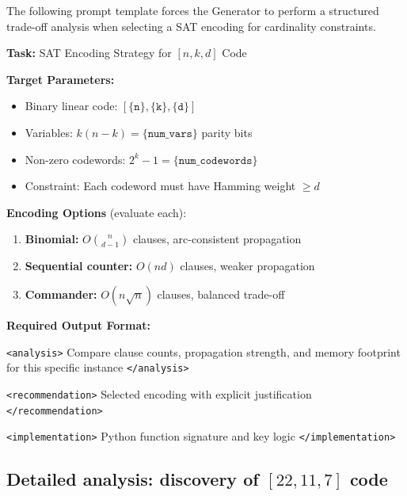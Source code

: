 The following prompt template forces the Generator to perform a structured trade-off analysis when selecting a SAT encoding for cardinality constraints.

\begin{tcolorbox}[enhanced, breakable, colback=white, colframe=black, title={Generator Prompt: SAT Encoding Strategy Selection}]
\textbf{Task:} SAT Encoding Strategy for $[n,k,d]$ Code

\tcbline

\textbf{Target Parameters:}
\begin{itemize}
\item Binary linear code: $[\texttt{\{n\}},\texttt{\{k\}},\texttt{\{d\}}]$
\item Variables: $k(n-k) = \texttt{\{num\_vars\}}$ parity bits
\item Non-zero codewords: $2^k - 1 = \texttt{\{num\_codewords\}}$
\item Constraint: Each codeword must have Hamming weight $\geq d$
\end{itemize}

\tcbline

\textbf{Encoding Options} (evaluate each):
\begin{enumerate}
\item \textbf{Binomial:} $O\binom{n}{d-1}$ clauses, arc-consistent propagation
\item \textbf{Sequential counter:} $O(nd)$ clauses, weaker propagation
\item \textbf{Commander:} $O(n\sqrt{n})$ clauses, balanced trade-off
\end{enumerate}

\tcbline

\textbf{Required Output Format:}

\texttt{<analysis>} Compare clause counts, propagation strength, and memory footprint for this specific instance \texttt{</analysis>}

\texttt{<recommendation>} Selected encoding with explicit justification \texttt{</recommendation>}

\texttt{<implementation>} Python function signature and key logic \texttt{</implementation>}
\end{tcolorbox}


\subsection{Detailed analysis: discovery of $[22,11,7]$ code}\label{sec:app_case_study}


